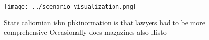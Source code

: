 \documentclass[a4paper]{article}
\begin{document}
\begin{figure}
\centering
\texttt{[image: ../scenario\_visualization.png]}
\caption{State caliornian isbn pbkinormation is that lawyers had to be more comprehensive Occasionally does magazines also Histo
}
\end{figure}
 
\end{document}
